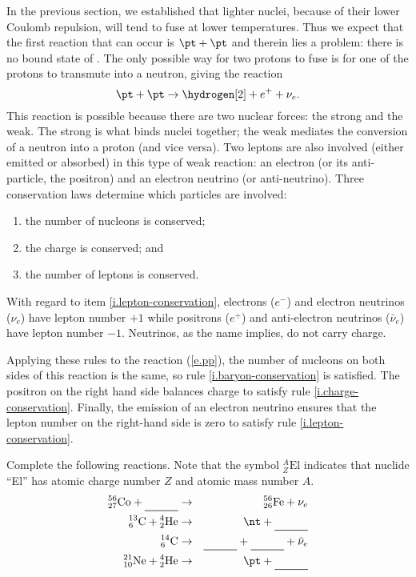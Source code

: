 In the previous section, we established that lighter nuclei, because of their lower Coulomb repulsion, will tend to fuse at lower temperatures. Thus we expect that the first reaction that can occur is $\pt+\pt$ and therein lies a problem: there is no bound state of \helium[2]. The only possible way for two protons to fuse is for one of the protons to transmute into a neutron, giving the reaction
\begin{equation}\label{e.pp}
	\pt + \pt \to \hydrogen[2] + e^{+} + \nu_{e}.
\end{equation}
This reaction is possible because there are two nuclear forces: the strong and the weak. The strong is what binds nuclei together; the weak mediates the conversion of a neutron into a proton (and vice versa). Two leptons are also involved (either emitted or absorbed) in this type of weak reaction: an electron (or its anti-particle, the positron) and an electron neutrino (or anti-neutrino). Three conservation laws determine which particles are involved:
\begin{enumerate}
\item\label{i.baryon-conservation} the number of nucleons is conserved;
\item\label{i.charge-conservation} the charge is conserved; and
\item\label{i.lepton-conservation} the number of leptons is conserved.
\end{enumerate}
With regard to item \ref{i.lepton-conservation}, electrons ($e^{-}$) and electron neutrinos ($\nu_{e}$) have lepton number $+1$ while positrons ($e^{+}$) and anti-electron neutrinos ($\bar{\nu}_{e}$) have lepton number $-1$. Neutrinos, as the name implies, do not carry charge.

Applying these rules to the reaction (\ref{e.pp}), the number of nucleons on both sides of this reaction is the same, so rule \ref{i.baryon-conservation} is satisfied. The positron on the right hand side balances charge to satisfy rule \ref{i.charge-conservation}. Finally, the emission of an electron neutrino ensures that the lepton number on the right-hand side is zero to satisfy rule \ref{i.lepton-conservation}.

\begin{exercisebox}
Complete the following reactions. Note that the symbol $_{Z}^{A}\mathrm{El}$ indicates that nuclide ``El'' has atomic charge number $Z$ and atomic mass number $A$.
\begin{eqnarray*}
\altnuc{27}{56}{Co} +  \nucarule &\to& \altnuc{26}{56}{Fe} + \nu_{e}\\
\altnuc{6}{13}{C} + \altnuc{2}{4}{He} &\to& \nt + \nucarule\\
\altnuc{6}{14}{C} &\to& \nucarule + \nucarule + \bar{\nu}_{e}\\
\altnuc{10}{21}{Ne} + \altnuc{2}{4}{He} &\to& \pt + \nucarule\\
\end{eqnarray*}
\end{exercisebox}

